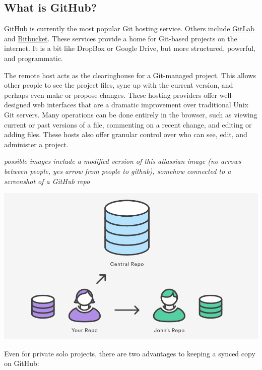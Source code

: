 \documentclass[12pt]{article}
\begin{document}
\subsection{What is GitHub?}\label{what-is-github}

\href{https://github.com}{GitHub} is currently the most popular Git
hosting service. Others include \href{https://about.gitlab.com}{GitLab}
and \href{https://bitbucket.org}{Bitbucket}. These services provide a
home for Git-based projects on the internet. It is a bit like DropBox or
Google Drive, but more structured, powerful, and programmatic.

The remote host acts as the clearinghouse for a Git-managed project.
This allows other people to see the project files, sync up with the
current version, and perhaps even make or propose changes. These hosting
providers offer well-designed web interfaces that are a dramatic
improvement over traditional Unix Git servers. Many operations can be
done entirely in the browser, such as viewing current or past versions
of a file, commenting on a recent change, and editing or adding files.
These hosts also offer granular control over who can see, edit, and
administer a project.

\emph{possible images include a modified version of this atlassian image
(no arrows between people, yes arrow from people to github), somehow
connected to a screenshot of a GitHub repo}

\includegraphics[width=1\linewidth]{atlassian-git-tutorials-syncing}

Even for private solo projects, there are two advantages to keeping a
synced copy on GitHub:
\end{document}
